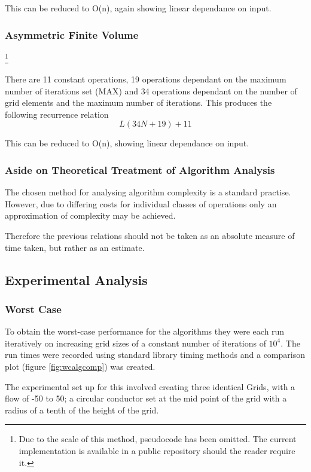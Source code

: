 \documentclass[aps,twocolumn,pre,nofootinbib,10pt]{revtex4-1}
\begin{document}
This can be reduced to O(n), again showing linear dependance on input.

\subsubsection{Asymmetric Finite Volume}

\footnote{Due to the scale of this method, pseudocode has been omitted. The current implementation is available in a public repository should the reader require it.}

There are 11 constant operations, 19 operations dependant on the maximum number of iterations set (MAX) and 34 operations dependant on the number of grid elements and the maximum number of iterations. This produces the following recurrence relation \[L(34N+19)+11\]

This can be reduced to O(n), showing linear dependance on input.

\subsubsection{Aside on Theoretical Treatment of Algorithm Analysis}

The chosen method for analysing algorithm complexity is a standard practise. However, due to differing costs for individual classes of operations only an approximation of complexity may be achieved.

Therefore the previous relations should not be taken as an absolute measure of time taken, but rather as an estimate.

\subsection{Experimental Analysis}
\subsubsection{Worst Case}

To obtain the worst-case performance for the algorithms they were each run iteratively on increasing grid sizes of a constant number of iterations of $10^4$. The run times were recorded using standard library timing methods and a comparison plot (figure \ref{fig:wcalgcomp}) was created.

The experimental set up for this involved creating three identical Grids, with a flow of -50 to 50; a circular conductor set at the mid point of the grid with a radius of a tenth of the height of the grid.
\end{document}
